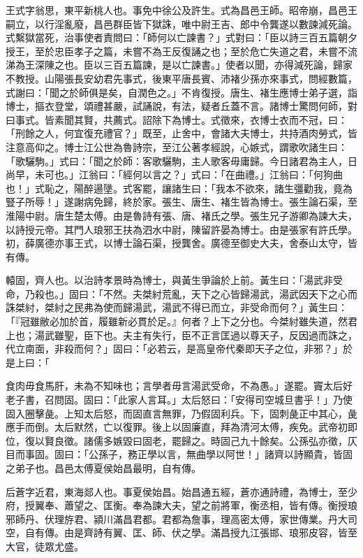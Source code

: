 \begin{pinyinscope}
王式字翁思，東平新桃人也。事免中徐公及許生。式為昌邑王師。昭帝崩，昌邑王嗣立，以行淫亂廢，昌邑群臣皆下獄誅，唯中尉王吉、郎中令龔遂以數諫減死論。式繫獄當死，治事使者責問曰：「師何以亡諫書？」式對曰：「臣以詩三百五篇朝夕授王，至於忠臣孝子之篇，未嘗不為王反復誦之也；至於危亡失道之君，未嘗不流涕為王深陳之也。臣以三百五篇諫，是以亡諫書。」使者以聞，亦得減死論，歸家不教授。山陽張長安幼君先事式，後東平唐長賓、沛褚少孫亦來事式，問經數篇，式謝曰：「聞之於師俱是矣，自潤色之。」不肯復授。唐生、褚生應博士弟子選，詣博士，摳衣登堂，頌禮甚嚴，試誦說，有法，疑者丘蓋不言。諸博士驚問何師，對曰事式。皆素聞其賢，共薦式。詔除下為博士。式徵來，衣博士衣而不冠，曰：「刑餘之人，何宜復充禮官？」既至，止舍中，會諸大夫博士，共持酒肉勞式，皆注意高仰之。博士江公世為魯詩宗，至江公著孝經說，心嫉式，謂歌吹諸生曰：「歌驪駒。」式曰：「聞之於師：客歌驪駒，主人歌客毋庸歸。今日諸君為主人，日尚早，未可也。」江翁曰：「經何以言之？」式曰：「在曲禮。」江翁曰：「何狗曲也！」式恥之，陽醉逿墬。式客罷，讓諸生曰：「我本不欲來，諸生彊勸我，竟為豎子所辱！」遂謝病免歸，終於家。張生、唐生、褚生皆為博士。張生論石渠，至淮陽中尉。唐生楚太傅。由是魯詩有張、唐、褚氏之學。張生兄子游卿為諫大夫，以詩授元帝。其門人琅邪王扶為泗水中尉，陳留許晏為博士。由是張家有許氏學。初，薛廣德亦事王式，以博士論石渠，授龔舍。廣德至御史大夫，舍泰山太守，皆有傳。

轅固，齊人也。以治詩孝景時為博士，與黃生爭論於上前。黃生曰：「湯武非受命，乃殺也。」固曰：「不然。夫桀紂荒亂，天下之心皆歸湯武，湯武因天下之心而誅桀紂，桀紂之民弗為使而歸湯武，湯武不得已而立，非受命而何？」黃生曰：「『冠雖敝必加於首，履雖新必貫於足。』何者？上下之分也。今桀紂雖失道，然君上也；湯武雖聖，臣下也。夫主有失行，臣不正言匡過以尊天子，反因過而誅之，代立南面，非殺而何？」固曰：「必若云，是高皇帝代秦即天子之位，非邪？」於是上曰：「

食肉毋食馬肝，未為不知味也；言學者毋言湯武受命，不為愚。」遂罷。竇太后好老子書，召問固。固曰：「此家人言耳。」太后怒曰：「安得司空城旦書乎！」乃使固入圈擊彘。上知太后怒，而固直言無罪，乃假固利兵。下，固刺彘正中其心，彘應手而倒。太后默然，亡以復罪。後上以固廉直，拜為清河太傅，疾免。武帝初即位，復以賢良徵。諸儒多嫉毀曰固老，罷歸之。時固己九十餘矣。公孫弘亦徵，仄目而事固。固曰：「公孫子，務正學以言，無曲學以阿世！」諸齊以詩顯貴，皆固之弟子也。昌邑太傅夏侯始昌最明，自有傳。

后蒼字近君，東海郯人也。事夏侯始昌。始昌通五經，蒼亦通詩禮，為博士，至少府，授翼奉、蕭望之、匡衡。奉為諫大夫，望之前將軍，衡丞相，皆有傳。衡授琅邪師丹、伏理斿君、潁川滿昌君都。君都為詹事，理高密太傅，家世傳業。丹大司空，自有傳。由是齊詩有翼、匡、師、伏之學。滿昌授九江張邯、琅邪皮容，皆至大官，徒眾尤盛。


\end{pinyinscope}
